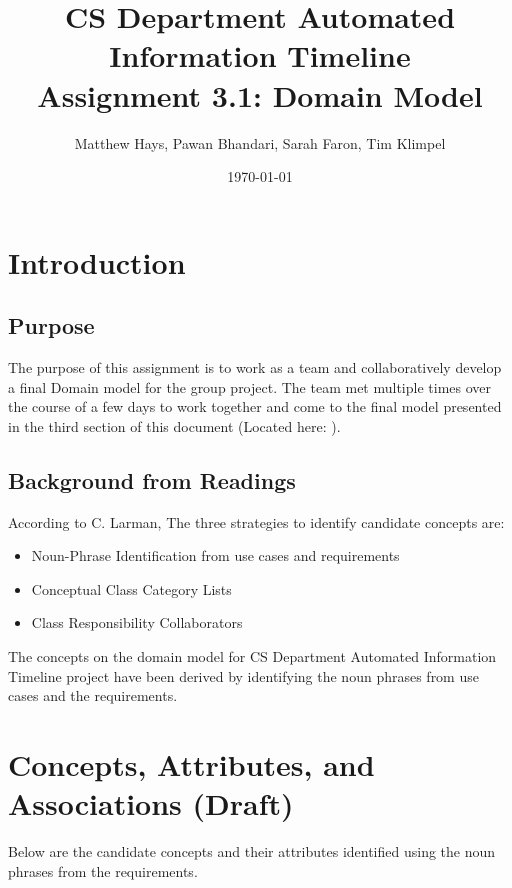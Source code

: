 \documentclass{article}
\title{CS Department Automated Information Timeline \\ Assignment 3.1: Domain Model}
\date{\today}
\author{Matthew Hays, Pawan Bhandari, Sarah Faron, Tim Klimpel}
\begin{document}
\maketitle
\newpage
\tableofcontents
\listoffigures
\newpage

\section{Introduction}
\subsection{Purpose}
The purpose of this assignment is to work as a team and collaboratively develop a final Domain model for the group project.  The team met multiple times over the course of a few days to work together and come to the final model presented in the third section of this document (Located here: ).

\subsection{Background from Readings}\label{sec:readings}
According to C. Larman, The three strategies to identify candidate concepts are:
\begin{itemize}
    \item Noun-Phrase Identification from use cases and requirements
    \item Conceptual Class Category Lists
    \item Class Responsibility Collaborators
\end{itemize}
The concepts on the domain model for CS Department Automated Information Timeline project have been derived by identifying the noun phrases from use cases and the requirements.

\section{Concepts, Attributes, and Associations (Draft)}
Below are the candidate concepts and their attributes identified using the noun phrases from the requirements.
\end{document}
